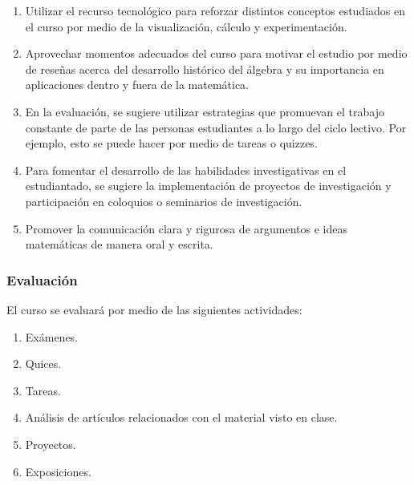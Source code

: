\begin{refsection}
\begin{enumerate}
    \item Utilizar el recurso tecnológico para reforzar distintos conceptos estudiados en el curso por medio de la visualización, cálculo y experimentación.
    \item Aprovechar momentos adecuados del curso para motivar el estudio por medio de reseñas acerca del desarrollo histórico del álgebra y su importancia en aplicaciones dentro y fuera de la matemática.
    \item En la evaluación, se sugiere utilizar estrategias que promuevan el trabajo constante de parte de las personas estudiantes a lo largo del ciclo lectivo. Por ejemplo, esto se puede hacer por medio de tareas o quizzes.
    \item Para fomentar el desarrollo de las habilidades investigativas en el estudiantado, se sugiere la implementación de proyectos de investigación y participación en coloquios o seminarios de investigación.
    \item Promover la comunicación clara y rigurosa de argumentos e ideas matemáticas de manera oral y escrita.
\end{enumerate}




\subsubsection*{Evaluación}

El curso se evaluará por medio de las siguientes actividades:

\begin{enumerate}
\item Exámenes.
\item Quices.
\item Tareas.
\item Análisis de artículos relacionados con el material visto en clase.
\item Proyectos.
\item Exposiciones.
\end{enumerate}

\nocite{Alu09}
\nocite{Alu21}
\nocite{CE20}
\nocite{Mor96}
\nocite{New12}
\nocite{Edw84}
\nocite{Sti10}
\nocite{Kle07}
\nocite{Kna16a}
\nocite{Kna16b}
\nocite{Lan02}
\nocite{Lan05}

\printcursosbibliography
\end{refsection}
